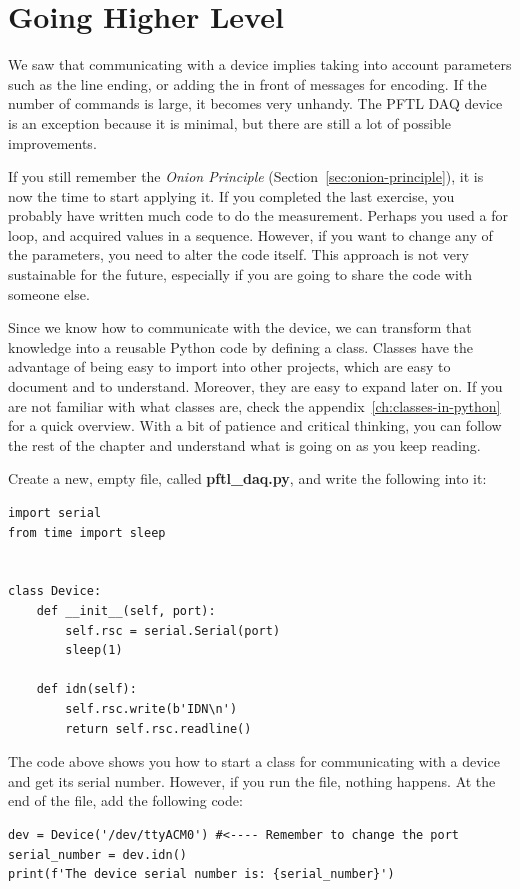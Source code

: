 \section{Going Higher Level}\label{sec:going-higher-level}
We saw that communicating with a device implies taking into account parameters such as the line ending, or adding the  in front of messages for encoding. If the number of commands is large, it becomes very unhandy. The {PFTL DAQ} device is an exception because it is minimal, but there are still a lot of possible improvements.

If you still remember the \emph{Onion Principle} (Section~\ref{sec:onion-principle}), it is now the time to start applying it. If you completed the last exercise, you probably have written much code to do the measurement. Perhaps you used a for loop, and acquired values in a sequence. However, if you want to change any of the parameters, you need to alter the code itself. This approach is not very sustainable for the future, especially if you are going to share the code with someone else.

Since we know how to communicate with the device, we can transform that knowledge into a reusable Python code by defining a class. Classes have the advantage of being easy to import into other projects, which are easy to document and to understand. Moreover, they are easy to expand later on. If you are not familiar with what classes are, check the appendix~\ref{ch:classes-in-python} for a quick overview. With a bit of patience and critical thinking, you can follow the rest of the chapter and understand what is going on as you keep reading.

Create a new, empty file, called \textbf{pftl\_daq.py}, and write the following into it:

\begin{verbatim}
import serial
from time import sleep


class Device:
    def __init__(self, port):
        self.rsc = serial.Serial(port)
        sleep(1)

    def idn(self):
        self.rsc.write(b'IDN\n')
        return self.rsc.readline()

\end{verbatim}

The code above shows you how to start a class for communicating with a device and get its serial number. However, if you run the file, nothing happens. At the end of the file, add the following code:

\begin{verbatim}
dev = Device('/dev/ttyACM0') #<---- Remember to change the port
serial_number = dev.idn()
print(f'The device serial number is: {serial_number}')
\end{verbatim}

